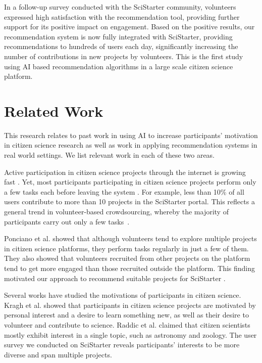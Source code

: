 \documentclass[letterpaper]{article} %
\begin{document}
In a  follow-up survey conducted with the SciStarter community, volunteers 
expressed high satisfaction with the recommendation tool, providing further support for its positive impact on engagement. 
Based on the positive results, our recommendation system is now fully integrated with SciStarter,  providing 
recommendations to hundreds of users each day, significantly increasing 
the number of contributions in new projects by volunteers.  This is the first study using AI based recommendation algorithms in a large scale  citizen science platform. 

\section{Related Work}
 This research relates to past work in using AI to increase participants' motivation in  citizen science research as well as work in applying recommendation systems in real world settings. We list relevant work in each of these two areas.   
  
Active  participation  in citizen science projects through the internet is growing  fast \cite{nov2014scientists,Irwin2018NoPN}. Yet, most participants   participating in citizen science projects perform only a few tasks each before leaving the system \cite{rotman2012dynamic}. For example,  less than 10\% of all users   contribute to more than 10 projects in the SciStarter portal.
This reflects a general trend in  volunteer-based crowdsourcing, whereby  the majority of participants carry out only a few tasks~\cite{segal2016intervention,segal2015improving}.


 Ponciano et al.    showed that although volunteers tend to explore multiple projects in citizen science platforms,  they perform tasks regularly in just a few of them. They   also showed that volunteers recruited from other projects on the platform tend to get more engaged than those recruited outside the platform. This finding motivated our approach 
to recommend suitable projects for  SciStarter . 

Several works  have studied the motivations of participants  in citizen science. 
Kragh et al.  showed that participants in citizen science projects are motivated by personal interest and a desire to learn something new, as well as their desire to volunteer and contribute to science. 
Raddic et al.   claimed that citizen scientists  mostly exhibit interest in a single  topic, such as astronomy and zoology. The  user survey  we 
conducted on SciStarter reveals participants'  interests to be more diverse and span multiple projects. 
\end{document}
